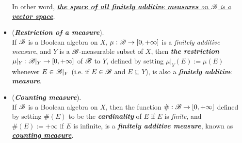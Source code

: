 \documentclass[11pt]{article}
\begin{document}
\begin{itemize}
\begin{example}
In other word, \underline{\emph{\textbf{the space of all finitely additive measures} on ${\mathscr B}$ is a \textbf{vector space}}}.
\end{example}

\item \begin{example} (\emph{\textbf{Restriction of a measure}}).\\
If ${\mathscr B}$ is a Boolean algebra on $X$, $\mu: {\mathscr B} \rightarrow [0, +\infty]$ is a \emph{finitely additive measure}, and $Y$ is a ${\mathscr B}$-measurable subset of $X$, then \emph{\textbf{the restriction}} $\mu|_{Y}: {\mathscr B}|_{Y}  \rightarrow [0, +\infty]$ of ${\mathscr B}$ to $Y$, defined by setting $\mu|_{Y}(E) := \mu(E)$ whenever $E \in {\mathscr B}|_{Y}$ (i.e.
if $E \in {\mathscr B}$ and $E \subseteq Y$), is also a \emph{\textbf{finitely additive measure}}.
\end{example}

\item \begin{example} (\emph{\textbf{Counting measure}}).\\
If ${\mathscr B}$ is a Boolean algebra on $X$, then the function $\#: {\mathscr B} \rightarrow [0, +\infty]$ defined by setting $\#(E)$ to be the \emph{\textbf{cardinality}} of $E$ if $E$ is \textit{finite}, and $\#(E) := +\infty$ if $E$ is infinite, is a \emph{\textbf{finitely additive measure}}, known as \underline{\emph{\textbf{counting measure}}}.
\end{example}


\end{itemize}
\end{document}
